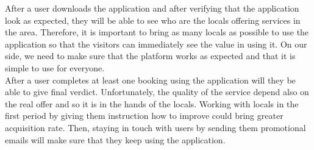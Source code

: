 After a user downloads the application and after verifying that the application look as expected, they will be able to see who are the locals offering services in the area. Therefore, it is important to bring as many locals as possible to use the application so that the visitors can immediately see the value in using it. On our side, we need to make sure that the platform works as expected and that it is simple to use for everyone. \\
After a user completes at least one booking using the application will they be able to give final verdict. Unfortunately, the quality of the service depend also on the real offer and so it is in the hands of the locals. Working with locals in the first period by giving them instruction how to improve could bring greater acquisition rate. Then, staying in touch with users by sending them promotional emails will make sure that they keep using the application.